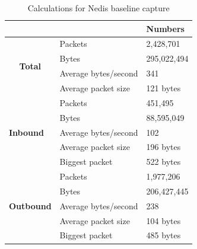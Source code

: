 \begin{table}[H]
    \caption{Calculations for Nedis baseline capture}
    \centering
    \begin{tabular}{ll|l|}
        \cline{3-3}                                               &                               &             \textbf{Numbers} \\ \hline
        \multicolumn{1}{|c|}{\multirow{4}{*}{\textbf{Total}}}    & Packets              & 2,428,701         \\ \cline{2-3} 
        \multicolumn{1}{|c|}{}                                   & Bytes                & 295,022,494       \\ \cline{2-3} 
        \multicolumn{1}{|c|}{}                                   & Average bytes/second & 341               \\ \cline{2-3} 
        \multicolumn{1}{|c|}{}                                   & Average packet size  & 121 bytes        \\ \hline
        \multicolumn{1}{|l|}{\multirow{5}{*}{\textbf{Inbound}}}  & Packets              & 451,495           \\ \cline{2-3} 
        \multicolumn{1}{|l|}{}                                   & Bytes                & 88,595,049        \\ \cline{2-3} 
        \multicolumn{1}{|l|}{}                                   & Average bytes/second & 102                \\ \cline{2-3} 
        \multicolumn{1}{|l|}{}                                   & Average packet size  & 196 bytes         \\ \cline{2-3} 
        \multicolumn{1}{|l|}{}                                   & Biggest packet       & 522 bytes        \\ \hline
        \multicolumn{1}{|l|}{\multirow{5}{*}{\textbf{Outbound}}} & Packets              & 1,977,206         \\ \cline{2-3} 
        \multicolumn{1}{|l|}{}                                   & Bytes                & 206,427,445      \\ \cline{2-3} 
        \multicolumn{1}{|l|}{}                                   & Average bytes/second & 238               \\ \cline{2-3} 
        \multicolumn{1}{|l|}{}                                   & Average packet size  & 104 bytes         \\ \cline{2-3} 
        \multicolumn{1}{|l|}{}                                   & Biggest packet       & 485 bytes       \\ \hline
    \end{tabular}
    \label{tab:NedisBaselineCalculations}
\end{table} 

